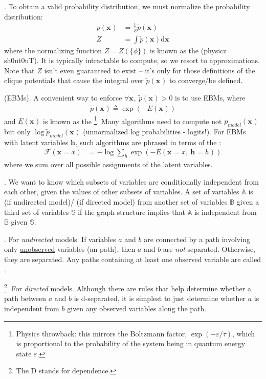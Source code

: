 \documentclass[11pt]{article}
\renewcommand\vec[2][]{\bm{#2}_{#1}}
\newcommand\myspace[1][]{\vspace{#1\bigskipamount}}
\newcommand\p{\Needspace{10\baselineskip} \noindent}
\begin{document}
\myspace
\p {}. To obtain a valid probability distribution, we must normalize the probability distribution:
\begin{align}
	p(\vec{x}) &= \frac{1}{Z} \widetilde{p}(\vec{x}) \\
	Z &= \int \widetilde{p}(\vec{x}) \mathrm{d}\vec{x}
\end{align}
where the normalizing function $Z = Z(\{\phi\})$ is known as the  (physicz sh0ut0uT). It is typically intractable to compute, so we resort to approximations. Note that $Z$ isn't even guaranteed to exist -- it's only for those definitions of the clique potentials that cause the integral over $\widetilde{p}(\vec{x})$ to converge/be defined.

\myspace
\p {} (EBMs). A convenient way to enforce $\forall \vec{x}, ~ \widetilde{p}(\vec{x}) > 0$ is to use EBMs, where
\begin{align}
	\widetilde{p}(\vec{x}) \triangleq \exp\left( -E(\vec{x}) \right)
\end{align}
and $E(\vec{x})$ is known as the \footnote{Physics throwback: this mirrors the Boltzmann factor, $\exp(-\varepsilon/\tau)$, which is proportional to the probability of the system being in quantum energy state $\varepsilon$.}. Many algorithms need to compute not $p_{model}(\vec{x})$ but only $\log\widetilde{p}_{model}(\vec{x})$ (unnormalized log probabilities - logits!). For EBMs with latent variables $\vec{h}$, such algorithms are phrased in terms of the :
\begin{align}
	\mathcal{F}(\vec{x} = x) &= -\log \sum_{h} \exp\left( - E(\vec{x}=x, ~ \vec{h} = h ) \right)
\end{align}
where we sum over all possible assignments of the latent variables.


\myspace
\p {}. We want to know which subsets of variables are conditionally independent from each other, given the values of other subsets of variables.  A set of variables $\mathbb{A}$ is  (if undirected model)/ (if directed model) from another set of variables $\mathbb{B}$ given a third set of variables $\mathbb{S}$ if the graph structure implies that $\mathbb{A}$ is independent from $\mathbb{B}$ given $\mathbb{S}$. 

\begin{compactitem}
	\item {}. For \textit{undirected} models. If variables $a$ and $b$ are connected by a path involving only \underline{unobserved} variables (an  path), then $a$ and $b$ are \textit{not} separated. Otherwise, they are separated. Any paths containing at least one observed variable are called .

	\item {}\footnote{The D stands for dependence.}. For \textit{directed} models. Although there are rules that help determine whether a path between $a$ and $b$ is d-separated, it is simplest to just determine whether $a$ is independent from $b$ given any observed variables along the path.
\end{compactitem}
\end{document}
